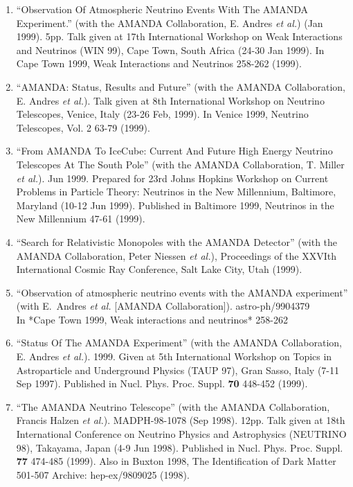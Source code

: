 \begin{enumerate}
\item ``Observation Of Atmospheric Neutrino Events With The
        AMANDA   Experiment.'' (with the AMANDA
        Collaboration, E. Andres {\it et al.}) (Jan   1999).
        5pp.  Talk given at 17th International Workshop on
        Weak   Interactions and Neutrinos (WIN 99), Cape
        Town, South Africa (24-30   Jan 1999). In Cape Town
        1999, Weak Interactions and Neutrinos   258-262
        (1999).

\item ``AMANDA: Status, Results and Future'' (with the
        AMANDA   Collaboration, E. Andres {\it et al.}).
        Talk given at 8th International   Workshop on
        Neutrino Telescopes, Venice, Italy (23-26 Feb,
        1999).  In   Venice 1999, Neutrino Telescopes, Vol.
        2 63-79 (1999).

\item ``From AMANDA To IceCube: Current And Future High
        Energy Neutrino   Telescopes At The South Pole''
        (with the AMANDA Collaboration,   T. Miller {\it et
        al.}). Jun 1999. Prepared for 23rd Johns Hopkins
        Workshop on Current Problems in Particle Theory:
        Neutrinos in the   New Millennium, Baltimore,
        Maryland (10-12 Jun 1999).  Published in   Baltimore
        1999, Neutrinos in the New Millennium 47-61 (1999).

\item ``Search for Relativistic Monopoles with the AMANDA
        Detector'' (with   the AMANDA Collaboration, Peter
        Niessen {\it et al.}), Proceedings of the   XXVIth
        International Cosmic Ray Conference, Salt Lake City,
        Utah   (1999).

\item ``Observation of atmospheric neutrino events with the
        AMANDA experiment'' (with E.~Andres {\it et al.}
        [AMANDA Collaboration]). astro-ph/9904379   \\{}In
        *Cape Town 1999, Weak interactions and neutrinos*
        258-262 %

\item ``Status Of The AMANDA Experiment'' (with the AMANDA
        Collaboration,   E. Andres {\it et al.}). 1999.
        Given at 5th International Workshop on   Topics in
        Astroparticle and Underground Physics (TAUP 97),
        Gran   Sasso, Italy (7-11 Sep 1997).  Published in
        Nucl. Phys. Proc. Suppl. {\bf 70} 448-452 (1999).

\item ``The AMANDA Neutrino Telescope'' (with the AMANDA
        Collaboration,   Francis Halzen {\it et al.}).
        MADPH-98-1078 (Sep 1998). 12pp.  Talk given   at
        18th International Conference on Neutrino Physics
        and   Astrophysics (NEUTRINO 98), Takayama, Japan
        (4-9 Jun 1998).   Published in Nucl. Phys. Proc.
        Suppl. {\bf 77} 474-485 (1999). Also   in Buxton
        1998, The Identification of Dark Matter 501-507
        Archive: hep-ex/9809025 (1998).


\end{enumerate}
